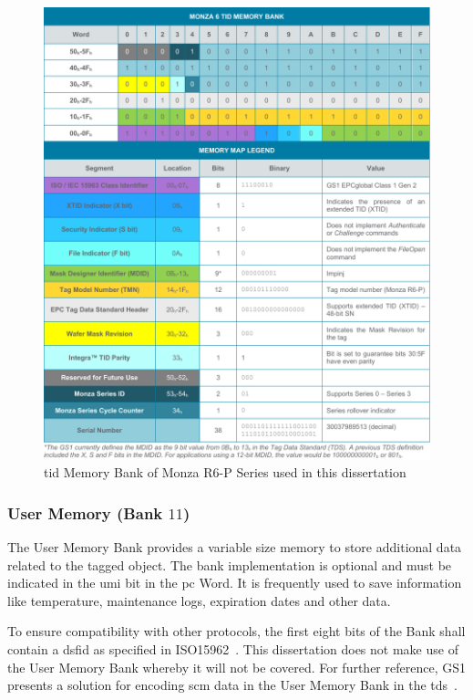 \begin{figure}
    \centering
    \includegraphics[width=\textwidth]{./figs/02-state-of-the-art/tid.pdf}
    \caption{\ac{tid} Memory Bank of Monza R6-P Series used in this dissertation~\cite{TIDMemoryMaps}} 
    \label{fig:tid}
\end{figure}

\subsubsection{User Memory (Bank $11$)}

The User Memory Bank provides a variable size memory to store additional data related to the tagged object.
The bank implementation is optional and must be indicated in the \ac{umi} bit in the \ac{pc} Word.
It is frequently used to save information like temperature, maintenance logs, expiration dates and other data.

To ensure compatibility with other protocols, the first eight bits of the Bank shall contain a \ac{dsfid} as specified in ISO15962~\cite{isoISOIEC15962}.
This dissertation does not make use of the User Memory Bank whereby it will not be covered.
For further reference, GS1 presents a solution for encoding \ac{scm} data in the User Memory Bank in the \ac{tds}~\cite{EPCTagData}.

